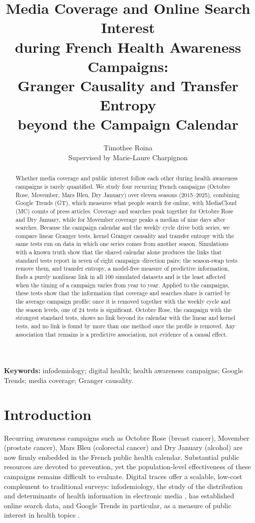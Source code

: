 \documentclass[11pt,a4paper]{article}
\title{\textbf{Media Coverage and Online Search Interest\\ during French Health Awareness Campaigns:\\
Granger Causality and Transfer Entropy\\ beyond the Campaign Calendar}}
\author{Timothee Roina\\[4pt]
\small Supervised by Marie-Laure Charpignon}
\date{}
\begin{document}
\maketitle

\begin{abstract}
Whether media coverage and public interest follow each other during health awareness campaigns is rarely quantified. We study four recurring French campaigns (Octobre Rose, Movember, Mars Bleu, Dry January) over eleven seasons (2015--2025), combining Google Trends (GT), which measures what people search for online, with MediaCloud (MC) counts of press articles. Coverage and searches peak together for Octobre Rose and Dry January, while for Movember coverage peaks a median of nine days after searches. Because the campaign calendar and the weekly cycle drive both series, we compare linear Granger tests, kernel Granger causality and transfer entropy with the same tests run on data in which one series comes from another season. Simulations with a known truth show that the shared calendar alone produces the links that standard tests report in seven of eight campaign--direction pairs; the season-swap tests remove them, and transfer entropy, a model-free measure of predictive information, finds a purely nonlinear link in all 100 simulated datasets and is the least affected when the timing of a campaign varies from year to year. Applied to the campaigns, these tests show that the information that coverage and searches share is carried by the average campaign profile: once it is removed together with the weekly cycle and the season levels, one of 24 tests is significant. Octobre Rose, the campaign with the strongest standard tests, shows no link beyond its calendar with the linear and kernel tests, and no link is found by more than one method once the profile is removed. Any association that remains is a predictive association, not evidence of a causal effect.
\end{abstract}

\noindent\textbf{Keywords:} infodemiology; digital health; health awareness campaigns; Google Trends; media coverage; Granger causality.

\section{Introduction}
Recurring awareness campaigns such as Octobre Rose (breast cancer), Movember (prostate cancer), Mars Bleu (colorectal cancer) and Dry January (alcohol) are now firmly embedded in the French public health calendar. Substantial public resources are devoted to prevention, yet the population-level effectiveness of these campaigns remains difficult to evaluate. Digital traces offer a scalable, low-cost complement to traditional surveys: infodemiology, the study of the distribution and determinants of health information in electronic media \cite{eysenbach2009}, has established online search data, and Google Trends in particular, as a measure of public interest in health topics \cite{nuti2014}.
\end{document}
